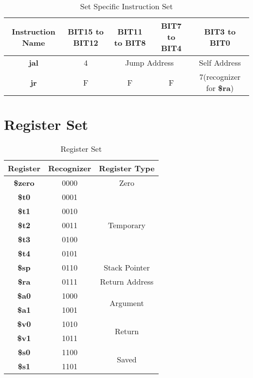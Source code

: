 \documentclass[12pt]{article}
\begin{document}
\begin{table}[H]
    \centering
    \begin{tabular}{|c|c|c|c|c|}
        \hline
        \textbf{Instruction Name} & \textbf{BIT15 to BIT12} & \textbf{BIT11 to BIT8} & \textbf{BIT7 to BIT4} & \textbf{BIT3 to BIT0} \\
        \hline
        \textbf{jal} & 4 & \multicolumn{2}{|c|}{Jump Address} & Self Address\\
        \hline    
        \textbf{jr} & F &  F & F & 7(recognizer for \textbf{\$ra})\\
        \hline
    \end{tabular}
    \caption{Set Specific Instruction Set}
    \label{tab:t3}
\end{table}

\section{Register Set}

\begin{table}[H]
    \centering
    \begin{tabular}{|c|c|c|}
    \hline
    \textbf{Register} & \textbf{Recognizer} & \textbf{Register Type}\\
    \hline
    \textbf{\$zero} & 0000 & Zero \\
    \hline
    \textbf{\$t0} & 0001 & \multirow{5}{*}{Temporary} \\
    \cline{1-2}
    \textbf{\$t1} & 0010 &  \\
    \cline{1-2}
    \textbf{\$t2} & 0011 &  \\
    \cline{1-2}
    \textbf{\$t3} & 0100 &  \\
    \cline{1-2}
    \textbf{\$t4} & 0101 &  \\
    \hline
    \textbf{\$sp} & 0110 & Stack Pointer \\
    \hline
    \textbf{\$ra} & 0111 & Return Address\\
    \hline
    \textbf{\$a0} & 1000 & \multirow{2}{*}{Argument} \\
    \cline{1-2}
    \textbf{\$a1} & 1001 &  \\
    \hline
    \textbf{\$v0} & 1010 & \multirow{2}{*}{Return} \\
    \cline{1-2}
    \textbf{\$v1} & 1011 &  \\
    \hline
    \textbf{\$s0} & 1100 & \multirow{2}{*}{Saved} \\
    \cline{1-2}
    \textbf{\$s1} & 1101 &  \\
    \hline
    \end{tabular}
    \caption{Register Set}
    \label{tab:t4}
\end{table}
\end{document}
